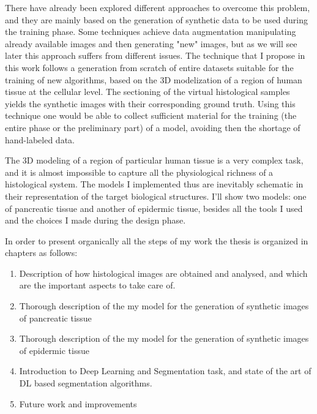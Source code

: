 There have already been explored different approaches to overcome this problem, and they are mainly based on the generation of synthetic data to be used during the training phase. Some techniques achieve data augmentation manipulating already available images and then generating "new" images, but as we will see later this approach suffers from different issues. The technique that I propose in this work follows a generation from scratch of entire datasets suitable for the training of new algorithms, based on the 3D modelization of a region of human tissue at the cellular level. The sectioning of the virtual histological samples yields the synthetic images with their corresponding ground truth. Using this technique one would be able to collect sufficient material for the training (the entire phase or the preliminary part) of a model, avoiding then the shortage of hand-labeled data.


The 3D modeling of a region of particular human tissue is a very complex task, and it is almost impossible to capture all the physiological richness of a histological system. The models I implemented thus are inevitably schematic in their representation of the target biological structures. I'll show two models: one of pancreatic tissue and another of epidermic tissue, besides all the tools I used and the choices I made during the design phase.


In order to present organically all the steps of my work the thesis is organized in chapters as follows:

\begin{enumerate}
    \item Description of how histological images are obtained and analysed, and which are the important aspects to take care of.
    \item Thorough description of the my model for the generation of synthetic images of pancreatic tissue
    \item Thorough description of the my model for the generation of synthetic images of epidermic tissue
    \item Introduction to Deep Learning and Segmentation task, and state of the art of DL based segmentation algorithms.
    \item Future work and improvements


\end{enumerate}
